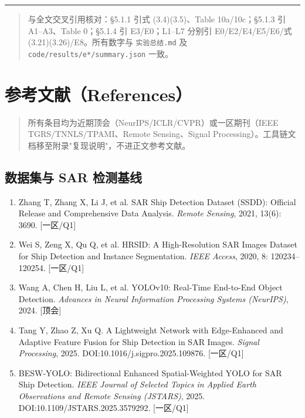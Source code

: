 \begin{center}\rule{0.5\linewidth}{0.5pt}\end{center}

\begin{quote}
与全文交叉引用核对：§5.1.1 引式 (3.4)(3.5)、Table 10a/10c；§5.1.3 引
A1--A3、Table 0；§5.1.4 引 E3/E0；L1--L7 分别引 E0/E2/E4/E5/E6/式
(3.21)(3.26)/E8。所有数字与 \texttt{实验总结.md} 及
\texttt{code/results/e*/summary.json} 一致。
\end{quote}

\section{参考文献（References）}\label{ux53c2ux8003ux6587ux732ereferences}

\begin{quote}
所有条目均为近期顶会（NeurIPS/ICLR/CVPR）或一区期刊（IEEE TGRS/TNNLS/TPAMI、Remote Sensing、Signal Processing）。工具链文档移至附录"复现说明"，不进正文参考文献。
\end{quote}

\subsection{数据集与 SAR 检测基线}\label{ux6570ux636eux96c6ux4e0e-sar-ux68c0ux6d4bux57faux7ebf}

\begin{enumerate}
\def\labelenumi{\arabic{enumi}.}
\tightlist
\item
  Zhang T, Zhang X, Li J, et al. SAR Ship Detection Dataset (SSDD): Official Release and Comprehensive Data Analysis. \emph{Remote Sensing}, 2021, 13(6): 3690. [一区/Q1]
\item
  Wei S, Zeng X, Qu Q, et al. HRSID: A High-Resolution SAR Images Dataset for Ship Detection and Instance Segmentation. \emph{IEEE Access}, 2020, 8: 120234–120254. [一区/Q1]
\item
  Wang A, Chen H, Liu L, et al. YOLOv10: Real-Time End-to-End Object Detection. \emph{Advances in Neural Information Processing Systems (NeurIPS)}, 2024. [顶会]
\item
  Tang Y, Zhao Z, Xu Q. A Lightweight Network with Edge-Enhanced and Adaptive Feature Fusion for Ship Detection in SAR Images. \emph{Signal Processing}, 2025. DOI:10.1016/j.sigpro.2025.109876. [一区/Q1]
\item
  BESW-YOLO: Bidirectional Enhanced Spatial-Weighted YOLO for SAR Ship Detection. \emph{IEEE Journal of Selected Topics in Applied Earth Observations and Remote Sensing (JSTARS)}, 2025. DOI:10.1109/JSTARS.2025.3579292. [一区/Q1]
\end{enumerate}

